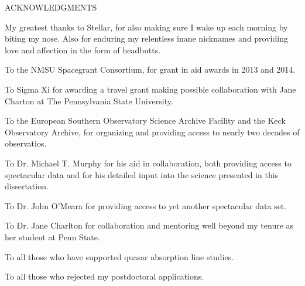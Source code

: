 \begin{center}
ACKNOWLEDGMENTS
\end{center}

My greatest thanks to Stellar, for also making sure I wake up each morning by biting my nose. Also for enduring my relentless inane nicknames and providing love and affection in the form of headbutts.

To the NMSU Spacegrant Consortium, for grant in aid awards in 2013 and 2014.

To Sigma Xi for awarding a travel grant making possible collaboration with Jane Charton at The Pennsylvania State University.

To the European Southern Observatory Science Archive Facility and the Keck Observatory Archive, for organizing and providing access to nearly two decades of observatios.

To Dr. Michael T. Murphy for his aid in collaboration, both providing access to spectacular data and for his detailed input into the science presented in this dissertation.

To Dr. John O'Meara for providing access to yet another spectacular data set.

To Dr. Jane Charlton for collaboration and mentoring well beyond my tenure as her student at Penn State.

To all those who have supported quasar absorption line studies.

To all those who rejected my postdoctoral applications.
